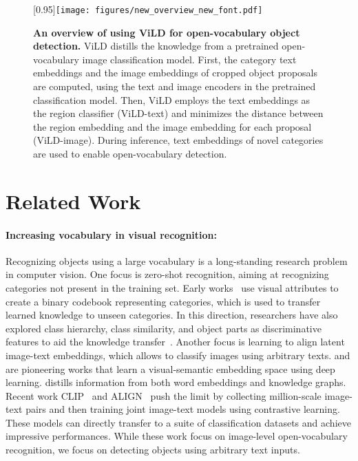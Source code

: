 \documentclass{article} \usepackage{iclr2022_conference,times}
\begin{document}
\begin{figure}[t]
\centering
   \scalebox{1.0}[0.95]{\texttt{[image: figures/new\_overview\_new\_font.pdf]}}
   \vspace{-1.5ex}
   \caption{
   \textbf{An overview of using ViLD for open-vocabulary object detection.}
   ViLD distills the knowledge from a pretrained open-vocabulary image classification model.
   First, the category text embeddings and the image embeddings of cropped object proposals are computed, using the text and image encoders in the pretrained classification model. 
   Then, ViLD employs the text embeddings as the region classifier (ViLD-text) and minimizes the distance between the region embedding and the image embedding for each proposal (ViLD-image).
   During inference, text embeddings of novel categories are used to enable open-vocabulary detection.
   }
\label{fig:overview}
\vspace{-2.5ex}
\end{figure}



\section{Related Work}
\vspace{-5pt}
\paragraph{Increasing vocabulary in visual recognition:}
Recognizing objects using a large vocabulary is a long-standing research problem in computer vision.
One focus is zero-shot recognition, aiming at recognizing categories not present in the training set. Early works~\citep{farhadi2009describing,rohrbach2011evaluating,jayaraman2014zero} use visual attributes to create a binary codebook representing categories, which is used to transfer learned knowledge to unseen categories. In this direction, researchers have also explored class hierarchy, class similarity, and object parts as discriminative features to aid the knowledge transfer~\citep{rohrbach2011evaluating,akata2016multi,zhao2017open_vocab_scene_parsing,elhoseiny2017link,ji2018stacked,cacheux2019modeling,xie2020region}. Another focus is learning to align latent image-text embeddings, which allows to classify images using arbitrary texts. \citet{frome2013devise} and \citet{norouzi2013zero} are pioneering works that learn a visual-semantic embedding space using deep learning. \citet{wang2018zero} distills information from both word embeddings and knowledge graphs. Recent work CLIP~\citep{radford2021clip} and ALIGN~\citep{align} push the limit by collecting million-scale image-text pairs and then training joint image-text models using contrastive learning. 
These models can directly transfer to a suite of classification datasets and achieve impressive performances.
While these work focus on image-level open-vocabulary recognition, we focus on detecting objects using arbitrary text inputs.
\end{document}
